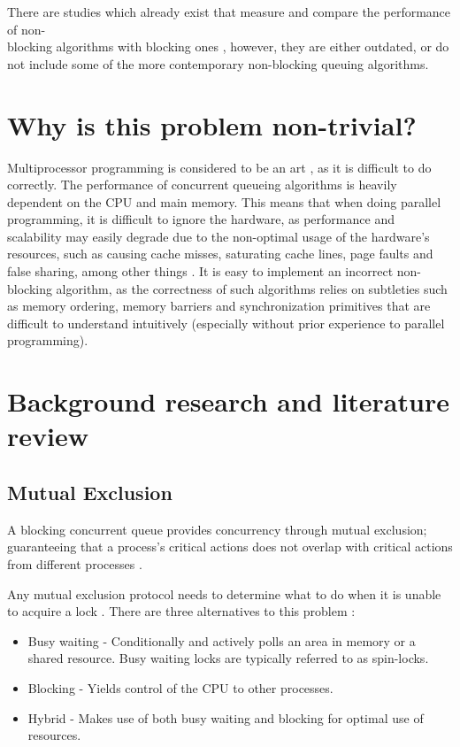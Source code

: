 \documentclass[a4paper, 12pt, titlepage]{article}
\begin{document}
\begin{singlespace}
There are studies which already exist that measure and compare the performance of non-\\blocking algorithms with blocking ones \cite{valois1995lock, michael1996simple}, however, they are either outdated, or do not include some of the more contemporary non-blocking queuing algorithms.

\section{Why is this problem non-trivial?}
Multiprocessor programming is considered to be an art \cite{herlihy2020art}, as it is difficult to do correctly. The performance of concurrent queueing algorithms is heavily dependent on the CPU and main memory. This means that when doing parallel programming, it is difficult to ignore the hardware, as performance and scalability may easily degrade due to the non-optimal usage of the hardware's resources, such as causing cache misses, saturating cache lines, page faults and false sharing, among other things \cite{herlihy2020art, mckenney2017parallel}. It is easy to implement an incorrect non-blocking algorithm, as the correctness of such algorithms relies on subtleties such as memory ordering, memory barriers and synchronization primitives that are difficult to understand intuitively (especially without prior experience to parallel programming).

\section{Background research and literature review}
\subsection{Mutual Exclusion}
A blocking concurrent queue provides concurrency through mutual exclusion; guaranteeing that a process's critical actions does not overlap with critical actions from different processes \cite{herlihy2020art,valois1995lock}. 

Any mutual exclusion protocol needs to determine what to do when it is unable to acquire a lock \cite[Chapter~7]{herlihy2020art}. There are three alternatives to this problem \cite[Chapter~7]{herlihy2020art}:
\begin{itemize}
  \item Busy waiting - Conditionally and actively polls an area in memory or a shared resource. Busy waiting locks are typically referred to as spin-locks.
  \item Blocking - Yields control of the CPU to other processes.
  \item Hybrid - Makes use of both busy waiting and blocking for optimal use of resources.
\end{itemize}


\end{singlespace}
\end{document}
